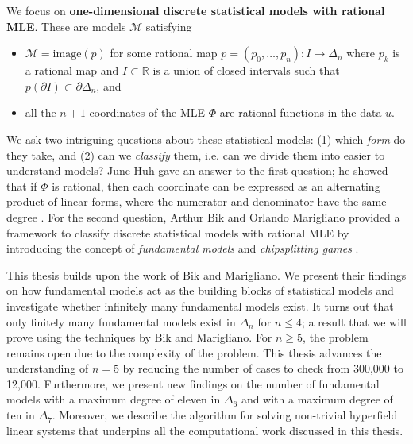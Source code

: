 We focus on \textbf{{one-dimensional {discrete} {statistical} {models} with rational MLE}}. These are models \( \mathcal{M} \) satisfying 
\begin{itemize}
    \item \( \mathcal{M} = \mathrm{image}(p) \) for some rational map \( p = (p_0, \dots, p_n): I \to \Delta_n \) where \( p_k \) is a rational map and \( I \subset \mathbb{R} \) is a union of closed intervals such that  \( p(\partial I) \subset \partial \Delta_n \), and
    \item all the \( n+1 \) coordinates of the MLE \( \Phi \) are rational functions in the data \( u \).
\end{itemize}

We ask two intriguing questions about these statistical models: (1) which \emph{form} do they take, and (2) can we \emph{classify} them, i.e. can we divide them into easier to understand models? June Huh gave an answer to the first question; he showed that if \( \Phi \) is rational, then each coordinate can be expressed as an alternating product of linear forms, where the numerator and denominator have the same degree \cite{huh2013varieties, huh2013maximum, duarte2021discrete}. For the second question, Arthur Bik and Orlando Marigliano provided a framework to classify discrete statistical models with rational MLE by introducing the concept of \emph{fundamental models} and \emph{chipsplitting games} \cite{bik2022classifying}.

This thesis builds upon the work of Bik and Marigliano. We present their findings on how fundamental models act as the building blocks of statistical models and investigate whether infinitely many fundamental models exist. It turns out that only finitely many fundamental models exist in \( \Delta_n \) for \( n \leq 4 \); a result that we will prove using the techniques by Bik and Marigliano. For \( n \geq 5 \), the problem remains open due to the complexity of the problem. This thesis advances the understanding of \( n = 5 \) by reducing the number of cases to check from 300,000 to 12,000. Furthermore, we present new findings on the number of fundamental models with a maximum degree of eleven in \( \Delta_6 \) and with a maximum degree of ten in \( \Delta_7 \). Moreover, we describe the algorithm for solving non-trivial hyperfield linear systems that underpins all the computational work discussed in this thesis. 

